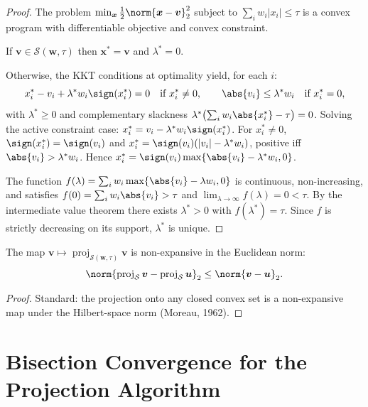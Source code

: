 \documentclass[11pt]{article}
\begin{document}
\begin{proof}
The problem
$\min_{\bm{x}}\tfrac12\norm{\bm{x}-\bm{v}}_2^2$
subject to $\sum_i w_i|x_i|\leq\tau$
is a convex program with differentiable objective and convex constraint.

If $\bm{v}\in\mathcal{S}(\bm{w},\tau)$ then $\bm{x}^*=\bm{v}$ and
$\lambda^*=0$.

Otherwise, the KKT conditions at optimality yield, for each $i$:
\[
  x^*_i - v_i + \lambda^* w_i \sign(x^*_i) = 0
  \quad \text{if } x^*_i \neq 0,
  \qquad \abs{v_i} \leq \lambda^* w_i
  \quad \text{if } x^*_i = 0,
\]
with $\lambda^*\geq 0$ and complementary slackness
$\lambda^*\bigl(\sum_i w_i\abs{x^*_i}-\tau\bigr)=0$.
Solving the active constraint case: $x^*_i = v_i - \lambda^* w_i \sign(x^*_i)$.
For $x^*_i\neq 0$, $\sign(x^*_i)=\sign(v_i)$ and
$x^*_i = \sign(v_i)(|v_i|-\lambda^* w_i)$, positive iff $\abs{v_i}>\lambda^* w_i$.
Hence $x^*_i = \sign(v_i)\max\{\abs{v_i}-\lambda^* w_i,0\}$.

The function $f(\lambda)=\sum_i w_i\max\{\abs{v_i}-\lambda w_i,0\}$
is continuous, non-increasing, and satisfies $f(0)=\sum_i w_i\abs{v_i}>\tau$
and $\lim_{\lambda\to\infty}f(\lambda)=0<\tau$.
By the intermediate value theorem there exists $\lambda^*>0$ with
$f(\lambda^*)=\tau$.  Since $f$ is strictly decreasing on its support,
$\lambda^*$ is unique.
\end{proof}

\begin{corollary}
\label{cor:nonexp}
The map $\bm{v}\mapsto\operatorname{proj}_{\mathcal{S}(\bm{w},\tau)}\bm{v}$
is non-expansive in the Euclidean norm:
\[
  \norm{\operatorname{proj}_\mathcal{S}\bm{v}
        - \operatorname{proj}_\mathcal{S}\bm{u}}_2
  \leq \norm{\bm{v}-\bm{u}}_2.
\]
\end{corollary}

\begin{proof}
Standard: the projection onto any closed convex set is a non-expansive map
under the Hilbert-space norm (Moreau, 1962).
\end{proof}

\section{Bisection Convergence for the Projection Algorithm}
\end{document}
